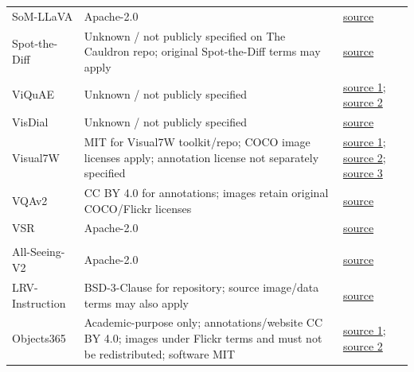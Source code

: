 \begin{longtable}{@{}>{\raggedright\arraybackslash}p{}>{\raggedright\arraybackslash}p{}>{\raggedright\arraybackslash}p{}@{}}
SoM-LLaVA & Apache-2.0 & \href{https://huggingface.co/datasets/zzxslp/SoM-LLaVA}{source} \\
Spot-the-Diff & Unknown / not publicly specified on The Cauldron repo; original Spot-the-Diff terms may apply & \href{https://huggingface.co/datasets/HuggingFaceM4/the_cauldron/tree/main/spot_the_diff}{source} \\
ViQuAE & Unknown / not publicly specified & \href{https://huggingface.co/datasets/PaulLerner/viquae_dataset/resolve/main/train.jsonl}{source 1}; \href{https://huggingface.co/datasets/PaulLerner/viquae_images/resolve/main/images.tar.gz}{source 2} \\
VisDial & Unknown / not publicly specified & \href{https://huggingface.co/datasets/HuggingFaceM4/VisDial}{source} \\
Visual7W & MIT for Visual7W toolkit/repo; COCO image licenses apply; annotation license not separately specified & \href{http://vision.stanford.edu/yukezhu/visual7w_images.zip}{source 1}; \href{https://ai.stanford.edu/~yukez/papers/resources/dataset_v7w_telling.zip}{source 2}; \href{https://ai.stanford.edu/~yukez/papers/resources/dataset_v7w_pointing.zip}{source 3} \\
VQAv2 & CC BY 4.0 for annotations; images retain original COCO/Flickr licenses & \href{https://huggingface.co/datasets/HuggingFaceM4/the_cauldron/tree/main/vqav2}{source} \\
VSR & Apache-2.0 & \href{https://raw.githubusercontent.com/cambridgeltl/visual-spatial-reasoning/refs/heads/master/data/splits/random/train.jsonl}{source} \\
\midrule
\rowcolor{instructcolor}\multicolumn{3}{l}{\textit{Grounding \& Counting}} \\
All-Seeing-V2 & Apache-2.0 & \href{https://huggingface.co/datasets/OpenGVLab/AS-V2}{source} \\
LRV-Instruction & BSD-3-Clause for repository; source image/data terms may also apply & \href{https://github.com/FuxiaoLiu/LRV-Instruction?tab=readme-ov-file\#instruction-data}{source} \\
Objects365 & Academic-purpose only; annotations/website CC BY 4.0; images under Flickr terms and must not be redistributed; software MIT & \href{https://dorc.ks3-cn-beijing.ksyun.com/data-set/2020Objects365\%E6\%95\%B0\%E6\%8D\%AE\%E9\%9B\%86/train/zhiyuan_objv2_train.tar.gz}{source 1}; \href{https://dorc.ks3-cn-beijing.ksyun.com/data-set/2020Objects365\%E6\%95\%B0\%E6\%8D\%AE\%E9\%9B\%86/train/patch*.tar.gz}{source 2} \\

\end{longtable}
